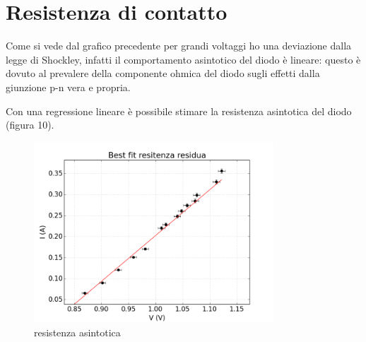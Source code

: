 \documentclass[a4paper,10pt]{article}
\begin{document}
\section{Resistenza di contatto}
Come si vede dal grafico precedente per grandi voltaggi ho una deviazione dalla legge di Shockley, infatti il comportamento asintotico del diodo è lineare: questo è dovuto al prevalere della componente ohmica del diodo sugli effetti dalla giunzione p-n vera e propria.

Con una regressione lineare è possibile stimare la resistenza asintotica del diodo (figura 10).

\begin{figure}[!htb]
\begin{center}
\includegraphics[width=0.8\textwidth]{resistenzaResidua.png}
\end{center}
\caption{resistenza asintotica}
\end{figure}
\end{document}
